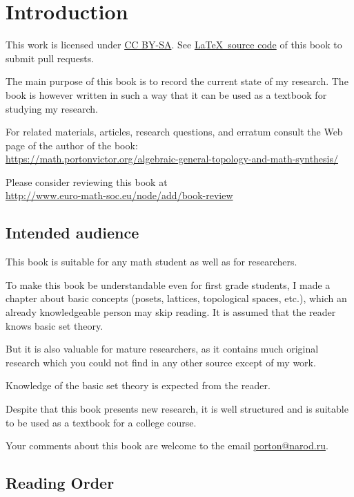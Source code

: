 
\chapter{Introduction}

This work is licensed under \href{https://creativecommons.org/licenses/by-sa/4.0/}{CC BY-SA}.
See \href{https://github.com/vporton/agt-combined}{\LaTeX\ source code} of this book to submit pull requests.

The main purpose of this book is to record the current state of my
research. The book is however written in such a way that it can be
used as a textbook for studying my research.

For related materials, articles, research questions, and erratum consult
the Web page of the author of the book:\\
\url{https://math.portonvictor.org/algebraic-general-topology-and-math-synthesis/}

Please consider reviewing this book at\\
\href{http://www.euro-math-soc.eu/node/add/book-review}{http://www.euro-math-soc.eu/node/add/book-review}

\section{Intended audience }

This book is suitable for any math student as well as for researchers.

To make this book be understandable even for first grade students,
I made a chapter about basic concepts (posets, lattices, topological
spaces, etc.), which an already knowledgeable person may skip reading.
It is assumed that the reader knows basic set theory.

But it is also valuable for mature researchers, as it contains much
original research which you could not find in any other source except
of my work.

Knowledge of the basic set theory is expected from the reader.

Despite that this book presents new research, it is well structured
and is suitable to be used as a textbook for a college course.

Your comments about this book are welcome to the email \href{mailto:porton@narod.ru}{porton@narod.ru}.


\section{Reading Order }


